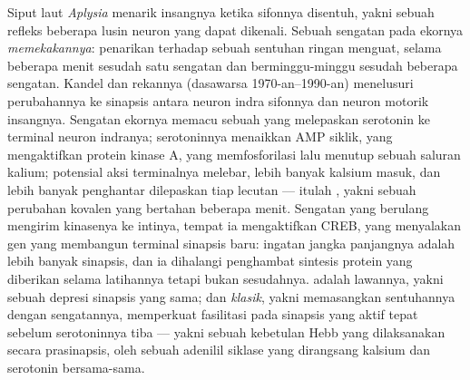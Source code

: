 \begin{proposition}\label{prop:b3:learning-memory:aplysia}
Siput laut \emph{Aplysia} menarik insangnya ketika sifonnya
disentuh, yakni sebuah refleks beberapa lusin neuron yang dapat dikenali. Sebuah sengatan pada
ekornya \emph{memekakannya}: penarikan terhadap sebuah sentuhan ringan menguat,
selama beberapa menit sesudah satu sengatan dan berminggu-minggu sesudah beberapa sengatan. Kandel dan
rekannya (dasawarsa 1970-an--1990-an) menelusuri perubahannya ke sinapsis antara
neuron indra sifonnya dan neuron motorik insangnya. Sengatan ekornya
memacu sebuah  yang melepaskan serotonin ke terminal neuron
indranya; serotoninnya menaikkan AMP siklik, yang mengaktifkan
protein kinase A, yang memfosforilasi lalu menutup sebuah saluran kalium;
potensial aksi terminalnya melebar, lebih banyak kalsium masuk, dan lebih banyak
penghantar dilepaskan tiap lecutan --- itulah \emph{},
yakni sebuah perubahan kovalen yang bertahan beberapa menit. Sengatan yang berulang mengirim kinasenya ke
intinya, tempat ia mengaktifkan CREB, yang menyalakan gen yang
membangun terminal sinapsis baru: ingatan jangka panjangnya adalah lebih banyak sinapsis,
dan ia dihalangi penghambat sintesis protein yang diberikan selama
latihannya tetapi bukan sesudahnya. \emph{} adalah lawannya,
yakni sebuah depresi sinapsis yang sama; dan \emph{ klasik},
yakni memasangkan sentuhannya dengan sengatannya, memperkuat fasilitasi pada
sinapsis yang aktif tepat sebelum serotoninnya tiba --- yakni sebuah
kebetulan Hebb yang dilaksanakan secara prasinapsis, oleh sebuah adenilil
siklase yang dirangsang kalsium dan serotonin bersama-sama.
\end{proposition}

